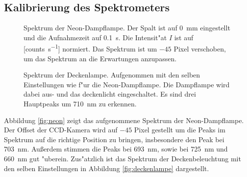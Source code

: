 \subsection{Kalibrierung des Spektrometers}
\begin{figure}[htbp]
    \centering
    
    \caption{
        Spektrum der Neon-Dampflampe.
        Der Spalt ist auf \SI{0}{\milli\metre} eingestellt und die Aufnahmezeit auf \SI{0.1}{\second}.
        Die Intensit"at $I$ ist auf [\si{counts\per\second}] normiert.
        Das Spektrum ist um $-45$ Pixel verschoben, um das Spektrum an die Erwartungen anzupassen.
    }
    \label{fig:neon}
\end{figure}
\begin{figure}[htbp]
    \centering
    
    \caption{
        Spektrum der Deckenlampe.
        Aufgenommen mit den selben Einstellungen wie f"ur die Neon-Dampflampe.
        Die Dampflampe wird dabei aus- und das deckenlicht eingeschaltet.
        Es sind drei Hauptpeaks um \SI{710}{\nano\metre} zu erkennen.
    }
    \label{fig:deckenlampe}
\end{figure}
Abbildung \vref{fig:neon} zeigt das aufgenommene Spektrum der Neon-Dampflampe.
Der Offset der CCD-Kamera wird auf $-45$ Pixel gestellt um die Peaks im Spektrum auf die richtige Position zu bringen, insbesondere den Peak bei \SI{703}{\nano\metre}.
Au\ss erdem stimmen die Peaks bei \SI{693}{\nano\metre}, sowie bei \SI{725}{\nano\metre} und \SI{660}{\nano\metre} gut "uberein.
Zus"atzlich ist das Spektrum der Deckenbeleuchtung mit den selben Einstellungen in Abbildung \vref{fig:deckenlampe} dargestellt.